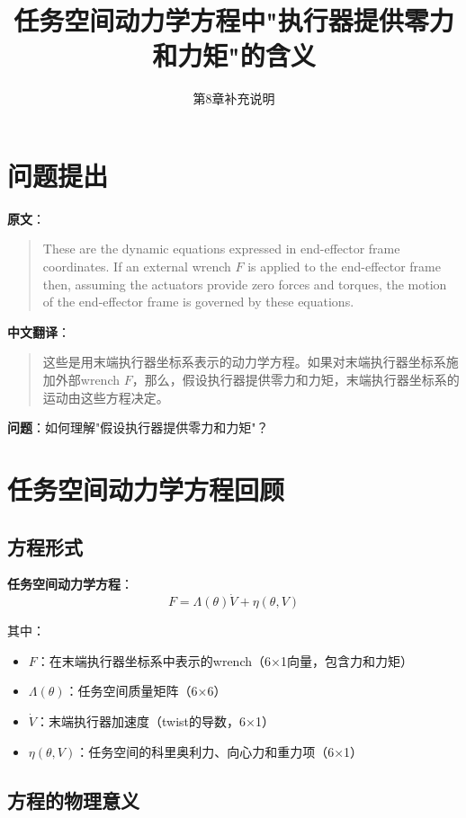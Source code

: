 \documentclass[12pt,a4paper]{article}
\title{任务空间动力学方程中"执行器提供零力和力矩"的含义}
\author{第8章补充说明}
\date{}
\begin{document}
\maketitle

\section{问题提出}

\textbf{原文}：
\begin{quote}
These are the dynamic equations expressed in end-effector frame coordinates. If an external wrench $F$ is applied to the end-effector frame then, assuming the actuators provide zero forces and torques, the motion of the end-effector frame is governed by these equations.
\end{quote}

\textbf{中文翻译}：
\begin{quote}
这些是用末端执行器坐标系表示的动力学方程。如果对末端执行器坐标系施加外部wrench $F$，那么，假设执行器提供零力和力矩，末端执行器坐标系的运动由这些方程决定。
\end{quote}

\textbf{问题}：如何理解"假设执行器提供零力和力矩"？

\section{任务空间动力学方程回顾}

\subsection{方程形式}

\textbf{任务空间动力学方程}：
\begin{equation}
F = \Lambda(\theta)\dot{V} + \eta(\theta, V) \tag{8.89}
\end{equation}

其中：
\begin{itemize}
\item $F$：在末端执行器坐标系中表示的wrench（6×1向量，包含力和力矩）
\item $\Lambda(\theta)$：任务空间质量矩阵（6×6）
\item $\dot{V}$：末端执行器加速度（twist的导数，6×1）
\item $\eta(\theta, V)$：任务空间的科里奥利力、向心力和重力项（6×1）
\end{itemize}

\subsection{方程的物理意义}
\end{document}
